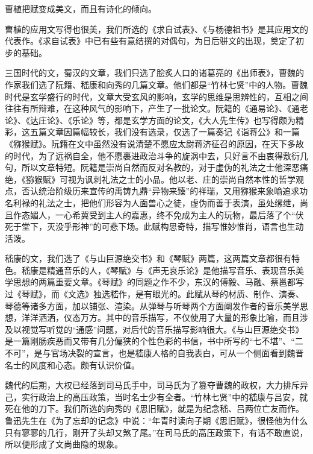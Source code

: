 曹植把赋变成美文，而且有诗化的倾向。

曹植的应用文写得也很美，我们所选的《求自试表》、《与杨德祖书》是其应用文的代表作。《求自试表》中已有些有意结撰的对偶句，为日后骈文的出现，奠定了初步的基础。

三国时代的文，蜀汉的文章，我们只选了脍炙人口的诸葛亮的《出师表》，曹魏的作家我们选了阮籍、嵇康和向秀的几篇文章。他们都是“竹林七贤”中的人物。曹魏时代是玄学盛行的时代，文章大受玄风的影响，玄学的思维是思辨性的，互相之间往往有所辩难，在这种风气的影响下，产生了一批论文。阮籍的《通易论》、《通老论》、《达庄论》、《乐论》等，都是玄学方面的论文，《大人先生传》也写得颇为精彩，这五篇文章因篇幅较长，我们没有选录，仅选了一篇奏记《诣蒋公》和一篇《猕猴赋》。阮籍在文中虽然没有说清楚不愿应太尉蒋济征召的原因，在天下多故的时代，为了远祸自全，他不愿裹进政治斗争的旋涡中去，只好言不由衷得敷衍几句，所以文章特短。阮籍是崇尚自然而反对名教的，对于虚伪的礼法之士他深恶痛绝，《猕猴赋》可视为讽刺礼法之士的小品。他以老、庄的崇尚自然本性的哲学观点，否认统治阶级历来宣传的禹铸九鼎“异物来臻”的祥瑞，又用猕猴来象喻追求功名利禄的礼法之士，把他们形容为人面兽心之徒，虚伪而善于表演，虽处缧绁，尚且作态媚人，一心希冀受到主人的嘉惠，终不免成为主人的玩物，最后落了个“伏死于堂下，灭没乎形神”的可悲下场。此赋构思奇特，描写惟妙惟肖，语言也生动活泼。

嵇康的文，我们选了《与山巨源绝交书》和《琴赋》两篇，这两篇文章都很有特色。嵇康是精通音乐的人，《琴赋》与《声无哀乐论》是他描写音乐、表现音乐美学思想的两篇重要文章。《琴赋》的同题之作不少，东汉的傅毅、马融、蔡邕都写过《琴赋》，而《文选》独选嵇作，是有眼光的。此赋从琴的材质、制作、演奏、琴德等诸多方面，加以铺张、渲染。从弹琴与听琴两个方面阐发作者的音乐美学思想，洋洋洒洒，仪态万方。其中的音乐描写，不仅使用了大量的形象比喻，而且涉及以视觉写听觉的“通感”问题，对后代的音乐描写影响很大。《与山巨源绝交书》是一篇刚肠疾恶而又带有几分偏狭的个性色彩的书信，书中所写的“七不堪”、“二不可”，是与官场决裂的宣言，也是嵇康人格的自我表白，可从一个侧面看到魏晋名士的风度和心态。颇有认识价值。

魏代的后期，大权已经落到司马氏手中，司马氏为了篡夺曹魏的政权，大力排斥异己，实行政治上的高压政策，当时名士少有全者。“竹林七贤”中的嵇康与吕安，就死在他的刀下。我们所选的向秀的《思旧赋》，就是为纪念嵇、吕两位亡友而作。鲁迅先生在《为了忘却的记念》中说：“年青时读向子期《思旧赋》，很怪他为什么只有寥寥的几行，刚开了头却又煞了尾。”在司马氏的高压政策下，有话不敢直说，所以便形成了文尚曲隐的现象。

